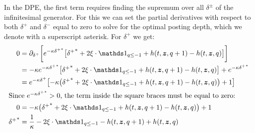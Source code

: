 In the DPE, the first term requires finding the supremum over all $\delta^\pm$ of the infinitesimal generator. For this we can set the partial derivatives with respect to both $\delta^+$ and $\delta^-$ equal to zero to solve for the optimal posting depth, which we denote with a superscript asterisk. For $\delta^+$ we get:
\begin{align}
0 & = \partial_{\delta^+} \biggl[ e^{ -\kappa {\delta^+}^*} \bigl[ {\delta^+}^* +  2 \xi \cdot \indicator_{q \leq -1} + h(t,\bz,q+1) - h(t,\bz,q) \bigr] \biggr] \\
& = -\kappa e^{ -\kappa {\delta^+}^*} \bigl[ {\delta^+}^* +2 \xi \cdot \indicator_{q \leq -1} + h(t,\bz,q+1) - h(t,\bz,q) \bigr] + e^{ -\kappa {\delta^+}^*} \\
& = e^{ -\kappa \delta^{+}} \bigl[ -\kappa \bigl( {\delta^+}^* +2 \xi \cdot \indicator_{q \leq -1} + h(t,\bz,q+1) - h(t,\bz,q) \bigr) + 1 \bigr] \\
\intertext{Since $e^{ -\kappa {\delta^+}^*}>0$, the term inside the square braces must be equal to zero:}
0 & = -\kappa \bigl( {\delta^+}^* +2 \xi \cdot \indicator_{q \leq -1} + h(t,\bz,q+1) - h(t,\bz,q) \bigr) + 1 \\
{\delta^+}^* & = \frac{1}{\kappa} - 2 \xi \cdot \indicator_{q \leq -1} - h(t,\bz,q+1) + h(t,\bz,q) 
\end{align}

